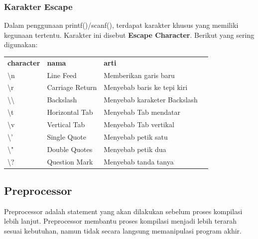 \documentclass[12pt,]{article}
\begin{document}
	\subsubsection{Karakter Escape}
	Dalam penggunaan printf()/scanf(), terdapat karakter khusus yang memiliki kegunaan tertentu.
	Karakter ini disebut \textbf{Escape Character}.
	Berikut yang sering digunakan:
	\begin{table}[H]
		\begin{tabular}{|l|l|l|l}
			\cline{1-3}
			\textbf{character} & \textbf{nama} & \textbf{arti} \\ \cline{1-3}
			\textbackslash n          & Line Feed	   & Memberikan garis baru        \\ \cline{1-3}
			\textbackslash r          & Carriage Return & Menyebab baris ke tepi kiri  \\ \cline{1-3}
			\textbackslash \textbackslash & Backslash       & Menyebab karaketer Backslash \\ \cline{1-3}
			\textbackslash t          & Horizontal Tab  & Menyebab Tab mendatar        \\ \cline{1-3}
			\textbackslash v          & Vertical Tab    & Menyebab Tab vertikal        \\ \cline{1-3}
			\textbackslash '          & Single Quote    & Menyebab petik satu          \\ \cline{1-3}
			\textbackslash "          & Double Quotes   & Menyebab petik dua           \\ \cline{1-3}
			\textbackslash ?          & Question Mark   & Menyebab tanda tanya         \\ \cline{1-3}
		\end{tabular}
	\end{table}
	
	\newpage
	\subsection{Preprocessor}
	
	Preprocessor adalah statement yang akan dilakukan sebelum proses kompilasi lebih lanjut.
	Preprocessor membantu proses kompilasi menjadi lebih terarah sesuai kebutuhan, namun tidak secara langsung memanipulasi program akhir.
	
\end{document}
